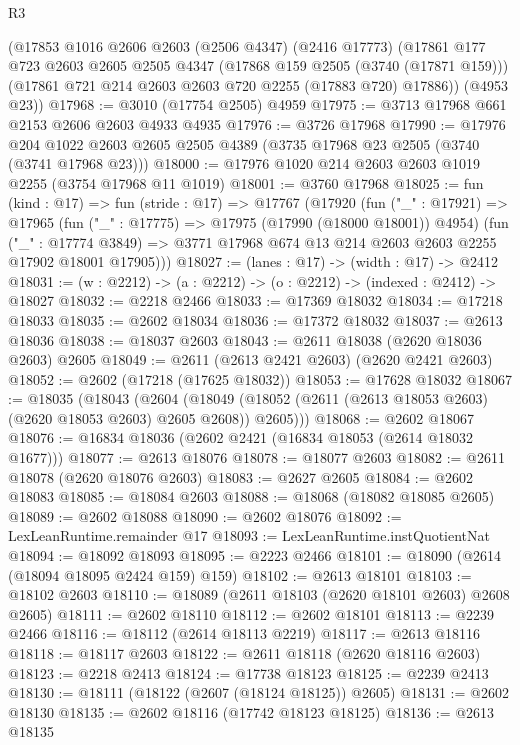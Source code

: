 \begin{lexlean}{R3}
\begin{coremodule}
    (@17853
      @1016
      @2606
      @2603
      (@2506 @4347)
      (@2416 @17773)
      (@17861
        @177
        @723
        @2603
        @2605
        @2505
        @4347
        (@17868 @159 @2505 (@3740 (@17871 @159)))
        (@17861 @721 @214 @2603 @2603 @720 @2255 (@17883 @720) @17886))
      (@4953 @23))
@17968 := @3010 (@17754 @2505) @4959
@17975 := @3713 @17968 @661 @2153 @2606 @2603 @4933 @4935
@17976 := @3726 @17968
@17990 := @17976
    @204
    @1022
    @2603
    @2605
    @2505
    @4389
    (@3735 @17968 @23 @2505 (@3740 (@3741 @17968 @23)))
@18000 := @17976 @1020 @214 @2603 @2603 @1019 @2255 (@3754 @17968 @11 @1019)
@18001 := @3760 @17968
@18025 := fun (kind : @17) =>
  fun (stride : @17) =>
  @17767
    (@17920
      (fun ("_" : @17921) =>
      @17965
        (fun ("_" : @17775) => @17975 (@17990 (@18000 @18001)) @4954)
        (fun ("_" : @17774 @3849) =>
        @3771 @17968 @674 @13 @214 @2603 @2603 @2255 @17902 @18001 @17905)))
@18027 := (lanes : @17) -> (width : @17) -> @2412
@18031 := (w : @2212) -> (a : @2212) -> (o : @2212) -> (indexed : @2412) -> @18027
@18032 := @2218 @2466
@18033 := @17369 @18032
@18034 := @17218 @18033
@18035 := @2602 @18034
@18036 := @17372 @18032
@18037 := @2613 @18036
@18038 := @18037 @2603
@18043 := @2611 @18038 (@2620 @18036 @2603) @2605
@18049 := @2611 (@2613 @2421 @2603) (@2620 @2421 @2603)
@18052 := @2602 (@17218 (@17625 @18032))
@18053 := @17628 @18032
@18067 := @18035
    (@18043
      (@2604 (@18049 (@18052 (@2611 (@2613 @18053 @2603) (@2620 @18053 @2603) @2605 @2608)) @2605)))
@18068 := @2602 @18067
@18076 := @16834 @18036 (@2602 @2421 (@16834 @18053 (@2614 @18032 @1677)))
@18077 := @2613 @18076
@18078 := @18077 @2603
@18082 := @2611 @18078 (@2620 @18076 @2603)
@18083 := @2627 @2605
@18084 := @2602 @18083
@18085 := @18084 @2603
@18088 := @18068 (@18082 @18085 @2605)
@18089 := @2602 @18088
@18090 := @2602 @18076
@18092 := LexLeanRuntime.remainder @17
@18093 := LexLeanRuntime.instQuotientNat
@18094 := @18092 @18093
@18095 := @2223 @2466
@18101 := @18090 (@2614 (@18094 @18095 @2424 @159) @159)
@18102 := @2613 @18101
@18103 := @18102 @2603
@18110 := @18089 (@2611 @18103 (@2620 @18101 @2603) @2608 @2605)
@18111 := @2602 @18110
@18112 := @2602 @18101
@18113 := @2239 @2466
@18116 := @18112 (@2614 @18113 @2219)
@18117 := @2613 @18116
@18118 := @18117 @2603
@18122 := @2611 @18118 (@2620 @18116 @2603)
@18123 := @2218 @2413
@18124 := @17738 @18123
@18125 := @2239 @2413
@18130 := @18111 (@18122 (@2607 (@18124 @18125)) @2605)
@18131 := @2602 @18130
@18135 := @2602 @18116 (@17742 @18123 @18125)
@18136 := @2613 @18135

\end{coremodule}
\end{lexlean}
